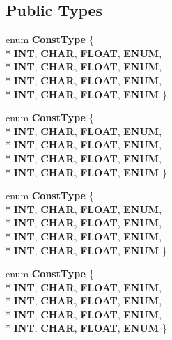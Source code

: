 \subsection*{Public Types}
\begin{DoxyCompactItemize}
\item 
enum {\bfseries Const\-Type} \{ \\*
{\bfseries I\-N\-T}, 
{\bfseries C\-H\-A\-R}, 
{\bfseries F\-L\-O\-A\-T}, 
{\bfseries E\-N\-U\-M}, 
\\*
{\bfseries I\-N\-T}, 
{\bfseries C\-H\-A\-R}, 
{\bfseries F\-L\-O\-A\-T}, 
{\bfseries E\-N\-U\-M}, 
\\*
{\bfseries I\-N\-T}, 
{\bfseries C\-H\-A\-R}, 
{\bfseries F\-L\-O\-A\-T}, 
{\bfseries E\-N\-U\-M}, 
\\*
{\bfseries I\-N\-T}, 
{\bfseries C\-H\-A\-R}, 
{\bfseries F\-L\-O\-A\-T}, 
{\bfseries E\-N\-U\-M}
 \}
\item 
enum {\bfseries Const\-Type} \{ \\*
{\bfseries I\-N\-T}, 
{\bfseries C\-H\-A\-R}, 
{\bfseries F\-L\-O\-A\-T}, 
{\bfseries E\-N\-U\-M}, 
\\*
{\bfseries I\-N\-T}, 
{\bfseries C\-H\-A\-R}, 
{\bfseries F\-L\-O\-A\-T}, 
{\bfseries E\-N\-U\-M}, 
\\*
{\bfseries I\-N\-T}, 
{\bfseries C\-H\-A\-R}, 
{\bfseries F\-L\-O\-A\-T}, 
{\bfseries E\-N\-U\-M}, 
\\*
{\bfseries I\-N\-T}, 
{\bfseries C\-H\-A\-R}, 
{\bfseries F\-L\-O\-A\-T}, 
{\bfseries E\-N\-U\-M}
 \}
\item 
enum {\bfseries Const\-Type} \{ \\*
{\bfseries I\-N\-T}, 
{\bfseries C\-H\-A\-R}, 
{\bfseries F\-L\-O\-A\-T}, 
{\bfseries E\-N\-U\-M}, 
\\*
{\bfseries I\-N\-T}, 
{\bfseries C\-H\-A\-R}, 
{\bfseries F\-L\-O\-A\-T}, 
{\bfseries E\-N\-U\-M}, 
\\*
{\bfseries I\-N\-T}, 
{\bfseries C\-H\-A\-R}, 
{\bfseries F\-L\-O\-A\-T}, 
{\bfseries E\-N\-U\-M}, 
\\*
{\bfseries I\-N\-T}, 
{\bfseries C\-H\-A\-R}, 
{\bfseries F\-L\-O\-A\-T}, 
{\bfseries E\-N\-U\-M}
 \}
\item 
enum {\bfseries Const\-Type} \{ \\*
{\bfseries I\-N\-T}, 
{\bfseries C\-H\-A\-R}, 
{\bfseries F\-L\-O\-A\-T}, 
{\bfseries E\-N\-U\-M}, 
\\*
{\bfseries I\-N\-T}, 
{\bfseries C\-H\-A\-R}, 
{\bfseries F\-L\-O\-A\-T}, 
{\bfseries E\-N\-U\-M}, 
\\*
{\bfseries I\-N\-T}, 
{\bfseries C\-H\-A\-R}, 
{\bfseries F\-L\-O\-A\-T}, 
{\bfseries E\-N\-U\-M}, 
\\*
{\bfseries I\-N\-T}, 
{\bfseries C\-H\-A\-R}, 
{\bfseries F\-L\-O\-A\-T}, 
{\bfseries E\-N\-U\-M}
 \}
\end{DoxyCompactItemize}
